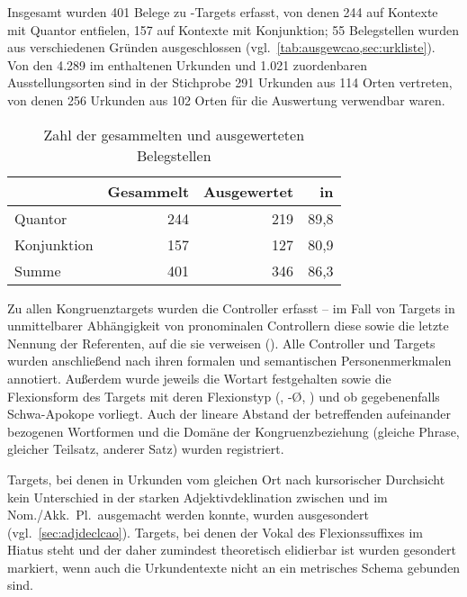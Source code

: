 \label{phsec:caohiatus}
Insgesamt wurden 401 Belege zu -Targets erfasst, von denen 244 auf
Kontexte mit Quantor entfielen, 157 auf Kontexte mit Konjunktion; 55
Belegstellen wurden aus verschiedenen Gründen ausgeschlossen
(vgl.~\cref{tab:ausgewcao,sec:urkliste}). Von den 4.289 im \CAO{}
enthaltenen Urkunden und 1.021 zuordenbaren Ausstellungsorten sind in der
Stichprobe 291 Urkunden aus 114 Orten vertreten, von denen 256 Urkunden aus 102
Orten für die Auswertung verwendbar waren.

\begin{table}
\centering
\caption{Zahl der gesammelten und ausgewerteten Belegstellen}
\begin{tabular}{l r r r}
\toprule

%
	& \bfseries Gesammelt
	& \bfseries Ausgewertet
	& \bfseries in \pct
	\\

\midrule


Quantor
	& 244 %
	& 219 %
	& 89,8 %
	\\

Konjunktion
	& 157 %
	& 127 %
	& 80,9 %
	\\

\midrule

Summe
	& 401 %
	& 346 %
	& 86,3 %
	\\

\bottomrule
\end{tabular}
\label{tab:ausgewcao}
\end{table}

Zu allen Kongruenztargets wurden die Controller erfasst -- im Fall von Targets
in unmittelbarer Abhängigkeit von pronominalen Controllern diese sowie die
letzte Nennung der Referenten, auf die sie verweisen ().
Alle Controller und Targets wurden anschließend nach ihren formalen und
semantischen Personenmerkmalen annotiert. Außerdem wurde jeweils die Wortart
festgehalten sowie die Flexionsform des Targets mit deren Flexionstyp
(, -Ø, ) und ob gegebenenfalls Schwa-Apokope vorliegt. Auch
der lineare Abstand der betreffenden aufeinander bezogenen Wortformen und die
Domäne der Kongruenzbeziehung (gleiche Phrase, gleicher Teilsatz, anderer Satz)
wurden registriert.

Targets, bei denen in Urkunden vom gleichen Ort nach kursorischer Durchsicht
kein Unterschied in der starken Adjektivdeklination zwischen  und
 im Nom./Akk.~Pl.\ ausgemacht werden konnte, wurden ausgesondert
(vgl.~\cref{sec:adjdeclcao}). Targets, bei denen der Vokal des Flexionssuffixes
im Hiatus steht und der daher zumindest theoretisch elidierbar ist
\autocites[vgl.][90--91]{askedal1973}[191]{gjelsten1980} wurden gesondert
markiert, wenn auch die Urkundentexte nicht an ein metrisches Schema gebunden
sind.

